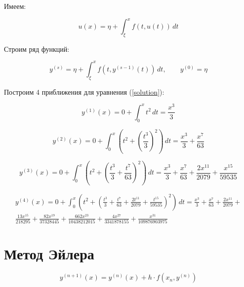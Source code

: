\documentclass[a4paper,14pt, unknownkeysallowed]{extreport}
\begin{document}
Имеем:

\begin{equation}
    \label{solution}
    u(x) = \eta +  \int_{\xi}^{x} f(t,u(t)) \,dt
\end{equation}

Строим ряд функций:

\begin{equation}
    \label{sol}
    y^{(s)} = \eta +  \int_{\xi}^{x} f(t,y^{(s-1)}(t)) \,dt, \quad \quad
    y^{(0)} = \eta
\end{equation}

Построим 4 приближения для уравнения (\ref{solution}):

\begin{equation}
    \label{f1}
    y^{(1)}(x) = 0 + \int_{0}^{x} t^2 \,dt = \frac{x^3}{3}
\end{equation}

\begin{equation}
    \label{f2}
    y^{(2)}(x) = 0 + \int_{0}^{x} (t^2 + \left(\frac{t^3}{3}\right)^2) \,dt = \frac{x^3}{3} + \frac{x^7}{63}
\end{equation}

\begin{equation}
    \label{f3}
    y^{(3)}(x) = 0 + \int_{0}^{x} (t^2 + \left(\frac{t^3}{3} + \frac{t^7}{63}\right)^2) \,dt = \frac{x^3}{3} + \frac{x^7}{63} + \frac{2x^{11}}{2079} + \frac{x^{15}}{59535}
\end{equation}

\begin{equation}
    \begin{split}
        \label{f4}
        y^{(4)}(x) = 0 + \int_{0}^{x} (t^2 + \left(\frac{t^3}{3} + \frac{t^7}{63} + \frac{2t^{11}}{2079} + \frac{t^{15}}{59535}\right)^2) \,dt = \frac{x^3}{3} + \frac{x^7}{63} + \frac{2x^{11}}{2079} +\\
        \frac{13x^{15}}{218295} + \frac{82x^{19}}{37328445} + \frac{662x^{23}}{10438212015} + \frac{4x^{27}}{3341878155} + \frac{x^{31}}{109876903975}
    \end{split}
\end{equation}


\section{Метод Эйлера}

\begin{equation}
    \label{ey}
    y^{(n+1)}(x) = y^{(n)}(x) + h \cdot f(x_{n}, y^{(n)})
\end{equation}
\end{document}

